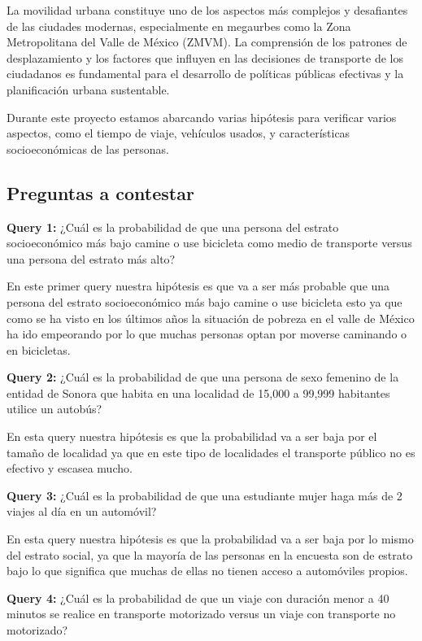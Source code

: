 \documentclass[12pt,a4paper]{article}
\begin{document}
La movilidad urbana constituye uno de los aspectos más complejos y desafiantes de las ciudades modernas, especialmente en megaurbes como la Zona Metropolitana del Valle de México (ZMVM). La comprensión de los patrones de desplazamiento y los factores que influyen en las decisiones de transporte de los ciudadanos es fundamental para el desarrollo de políticas públicas efectivas y la planificación urbana sustentable.

Durante este proyecto estamos abarcando varias hipótesis para verificar varios aspectos, como el tiempo de viaje, vehículos usados, y características socioeconómicas de las personas.

\subsection{Preguntas a contestar}

\textbf{Query 1:} ¿Cuál es la probabilidad de que una persona del estrato socioeconómico más bajo camine o use bicicleta como medio de transporte versus una persona del estrato más alto?

En este primer query nuestra hipótesis es que va a ser más probable que una persona del estrato socioeconómico más bajo camine o use bicicleta esto ya que como se ha visto en los últimos años la situación de pobreza en el valle de México ha ido empeorando por lo que muchas personas optan por moverse caminando o en bicicletas.

\textbf{Query 2:} ¿Cuál es la probabilidad de que una persona de sexo femenino de la entidad de Sonora que habita en una localidad de 15,000 a 99,999 habitantes utilice un autobús?

En esta query nuestra hipótesis es que la probabilidad va a ser baja por el tamaño de localidad ya que en este tipo de localidades el transporte público no es efectivo y escasea mucho.

\textbf{Query 3:} ¿Cuál es la probabilidad de que una estudiante mujer haga más de 2 viajes al día en un automóvil?

En esta query nuestra hipótesis es que la probabilidad va a ser baja por lo mismo del estrato social, ya que la mayoría de las personas en la encuesta son de estrato bajo lo que significa que muchas de ellas no tienen acceso a automóviles propios.

\textbf{Query 4:} ¿Cuál es la probabilidad de que un viaje con duración menor a 40 minutos se realice en transporte motorizado versus un viaje con transporte no motorizado?
\end{document}
